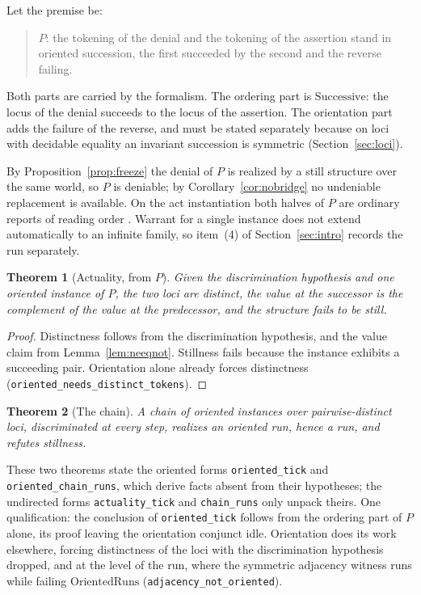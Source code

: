 \documentclass[11pt]{article}
\newtheorem{theorem}{Theorem}[section]
\newcommand{\lf}[1]{\texttt{#1}}
\begin{document}
Let the premise be:
\begin{quote}
$P$: the tokening of the denial and the tokening of the assertion stand in oriented succession, the first succeeded by the second and the reverse failing.
\end{quote}

Both parts are carried by the formalism. The ordering part is $\mathrm{Successive}$: the locus of the denial succeeds to the locus of the assertion. The orientation part adds the failure of the reverse, and must be stated separately because on loci with decidable equality an invariant succession is symmetric (Section~\ref{sec:loci}).

By Proposition~\ref{prop:freeze} the denial of $P$ is realized by a still structure over the same world, so $P$ is deniable; by Corollary~\ref{cor:nobridge} no undeniable replacement is available. On the act instantiation both halves of $P$ are ordinary reports of reading order \cite{moore1925}. Warrant for a single instance does not extend automatically to an infinite family, so item~(4) of Section~\ref{sec:intro} records the run separately.

\begin{theorem}[Actuality, from $P$]
\label{thm:actuality}
Given the discrimination hypothesis and one oriented instance of $P$, the two loci are distinct, the value at the successor is the complement of the value at the predecessor, and the structure fails to be still.
\end{theorem}

\begin{proof}
Distinctness follows from the discrimination hypothesis, and the value claim from Lemma~\ref{lem:neeqnot}. Stillness fails because the instance exhibits a succeeding pair. Orientation alone already forces distinctness (\lf{oriented\_needs\_distinct\_tokens}).
\end{proof}

\begin{theorem}[The chain]
\label{thm:chain}
A chain of oriented instances over pairwise-distinct loci, discriminated at every step, realizes an oriented run, hence a run, and refutes stillness.
\end{theorem}

These two theorems state the oriented forms \lf{oriented\_tick} and \lf{oriented\_chain\_runs}, which derive facts absent from their hypotheses; the undirected forms \lf{actuality\_tick} and \lf{chain\_runs} only unpack theirs. One qualification: the conclusion of \lf{oriented\_tick} follows from the ordering part of $P$ alone, its proof leaving the orientation conjunct idle. Orientation does its work elsewhere, forcing distinctness of the loci with the discrimination hypothesis dropped, and at the level of the run, where the symmetric adjacency witness runs while failing $\mathrm{OrientedRuns}$ (\lf{adjacency\_not\_oriented}).
\end{document}

